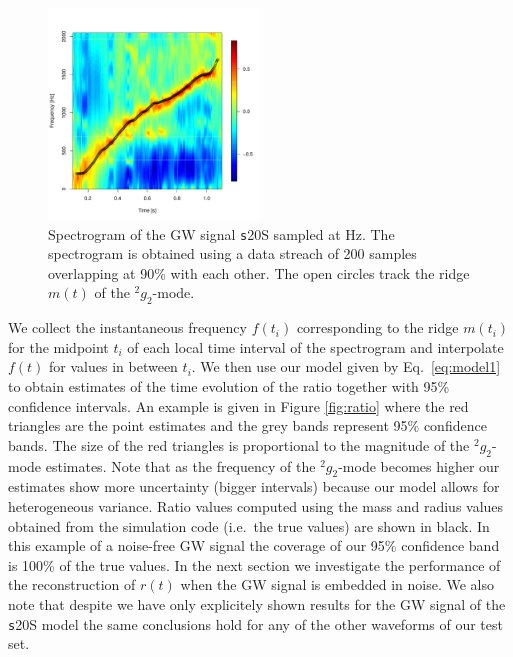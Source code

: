 \begin{figure}
 \centering
 \includegraphics[width=0.5\textwidth]{plots/spectrogram}
 \caption{Spectrogram of the GW signal {\texttt s20S} sampled at \unit[4096]{Hz}.
   The spectrogram is obtained using a data streach of 200 samples overlapping at 90\%
   with each other. The open circles track the ridge $m(t) $ of the $\mbox{}^2 g_2$-mode. } \label{fig:spectrogram}
\end{figure}

We collect the instantaneous frequency $f(t_i)$ corresponding to the ridge $m(t_i)$ for
the midpoint $t_i$ of each local time interval of the spectrogram and interpolate $f(t)$
for values in between $t_i$. We then use our model given by Eq.~\eqref{eq:model1} to obtain
estimates of the time evolution of the ratio together with 95\% confidence intervals.
An example is given in Figure \ref{fig:ratio} where the red triangles are the point estimates and
the grey bands represent 95\% confidence bands. The size of the red triangles is proportional to the magnitude of the $\mbox{}^2 g_2$-mode  estimates.  
Note that as the frequency of the $\mbox{}^2 g_2$-mode becomes higher our estimates show more uncertainty (bigger intervals) because our model allows for heterogeneous variance. Ratio values
computed using the mass and radius values obtained from the simulation code (i.e.~the true values)
are shown in black. In this example of a noise-free GW signal the coverage of our 95\% confidence band is 100\%
of the true values. In the next section we investigate the performance of the reconstruction of $r(t)$ when the GW
signal is embedded in noise. We also note that despite we have only explicitely shown results for the GW signal of the {\texttt s20S} model the same conclusions hold for any of the other waveforms of our test set.

